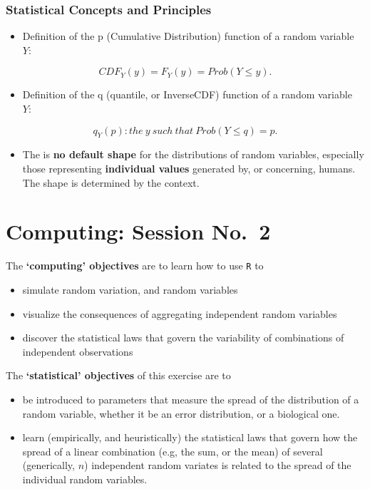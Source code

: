 \documentclass[]{book}
\providecommand{\tightlist}{%
  \setlength{\itemsep}{0pt}\setlength{\parskip}{0pt}}
\begin{document}
\hypertarget{statistical-concepts-and-principles}{%
\subsection{Statistical Concepts and Principles}\label{statistical-concepts-and-principles}}

\begin{itemize}
\tightlist
\item
  Definition of the p (Cumulative Distribution) function of a random variable \(Y:\)
\end{itemize}

\[CDF_Y(y) = F_Y(y) =  Prob( Y \le y).\]

\begin{itemize}
\tightlist
\item
  Definition of the q (quantile, or InverseCDF) function of a random variable \(Y:\)
\end{itemize}

\[ q_Y(p) : the \ y \ such \ that \ Prob( Y \le q) = p.\]

\begin{itemize}
\tightlist
\item
  The is \textbf{no default shape} for the distributions of random variables, especially those representing \textbf{individual values} generated by, or concerning, humans. The shape is determined by the context.
\end{itemize}

\hypertarget{computing02}{%
\chapter{Computing: Session No.~2}\label{computing02}}

The \textbf{`computing' objectives} are to learn how to use \texttt{R} to

\begin{itemize}
\item
  simulate random variation, and random variables
\item
  visualize the consequences of aggregating independent random variables\\
\item
  discover the statistical laws that govern the variability of combinations of independent observations
\end{itemize}

The \textbf{`statistical' objectives} of this exercise are to

\begin{itemize}
\item
  be introduced to parameters that measure the spread of the distribution of a random variable, whether it be an error distribution, or a biological one.
\item
  learn (empirically, and heuristically) the statistical laws that govern how the spread of a linear combination (e.g, the sum, or the mean) of several (generically, \(n\)) independent random variates is related to the spread of the individual random variables.
\end{itemize}
\end{document}
